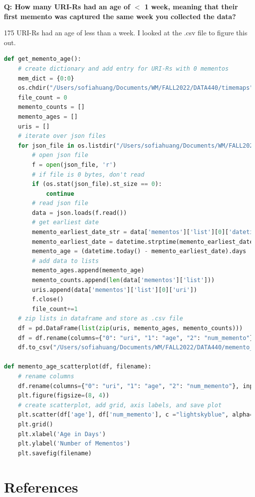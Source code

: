 \documentclass[12pt]{article}
\begin{document}
\textbf{Q: How many URI-Rs had an age of $<$ 1 week, meaning that their first memento was captured the same week you collected the data?}

175 URI-Rs had an age of less than a week. I looked at the .csv file to figure this out.

\begin{lstlisting}[language=Python, caption=Create scatterplot to show age of mementos, label=lst:copy]
def get_memento_age():
    # create dictionary and add entry for URI-Rs with 0 mementos
    mem_dict = {0:0}
    os.chdir("/Users/sofiahuang/Documents/WM/FALL2022/DATA440/timemaps")
    file_count = 0
    memento_counts = []
    memento_ages = []
    uris = []
    # iterate over json files
    for json_file in os.listdir("/Users/sofiahuang/Documents/WM/FALL2022/DATA440/timemaps"):
        # open json file
        f = open(json_file, 'r')
        # if file is 0 bytes, don't read
        if (os.stat(json_file).st_size == 0):
            continue
        # read json file
        data = json.loads(f.read())
        # get earliest date 
        memento_earliest_date_str = data['mementos']['list'][0]['datetime']
        memento_earliest_date = datetime.strptime(memento_earliest_date_str[0:10], '%Y-%m-%d')
        memento_age = (datetime.today() - memento_earliest_date).days
        # add data to lists
        memento_ages.append(memento_age)
        memento_counts.append(len(data['mementos']['list']))
        uris.append(data['mementos']['list'][0]['uri'])
        f.close()
        file_count+=1
    # zip lists in dataframe and store as .csv file
    df = pd.DataFrame(list(zip(uris, memento_ages, memento_counts)))
    df = df.rename(columns={"0": "uri", "1": "age", "2": "num_memento"})
    df.to_csv("/Users/sofiahuang/Documents/WM/FALL2022/DATA440/memento_ages_counts.csv", index=False)

def memento_age_scatterplot(df, filename):
    # rename columns
    df.rename(columns={"0": "uri", "1": "age", "2": "num_memento"}, inplace=True)
    plt.figure(figsize=(8, 4))
    # create scatterplot, add grid, axis labels, and save plot
    plt.scatter(df['age'], df['num_memento'], c ="lightskyblue", alpha=0.5, edgecolors='steelblue')
    plt.grid()
    plt.xlabel('Age in Days')
    plt.ylabel('Number of Mementos')
    plt.savefig(filename)
\end{lstlisting}

\section*{References}
\end{document}
